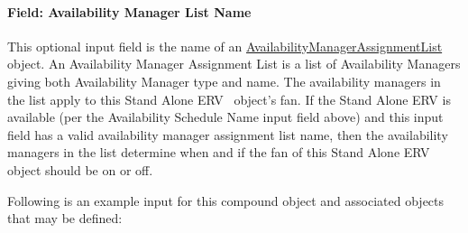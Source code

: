 \paragraph{Field: Availability Manager List Name}\label{field-availability-manager-list-name-9}

This optional input field is the name of an \hyperref[availabilitymanagerassignmentlist]{AvailabilityManagerAssignmentList} object. An Availability Manager Assignment List is a list of Availability Managers giving both Availability Manager type and name. The availability managers in the list apply to this Stand Alone ERV~ object's fan. If the Stand Alone ERV is available (per the Availability Schedule Name input field above) and this input field has a valid availability manager assignment list name, then the availability managers in the list determine when and if the fan of this Stand Alone ERV~ object should be on or off.

Following is an example input for this compound object and associated objects that may be defined:

